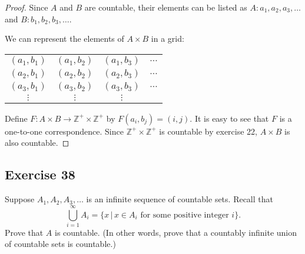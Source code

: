 \documentclass[14pt]{extarticle}
\newcommand{\Z}{\mathbb{Z}}
\begin{document}
\begin{proof}
    Since $A$ and $B$ are countable, their elements can be listed as \(A: a_1, a_2, a_3, \ldots\) and \(B: b_1, b_2, b_3, \ldots\).

    We can represent the elements of \(A \times B\) in a grid:

    \begin{center}
        \begin{tabular}{cccc}
            \((a_1, b_1)\) & \((a_1, b_2)\) & \((a_1, b_3)\) & \(\ldots\) \\
            \((a_2, b_1)\) & \((a_2, b_2)\) & \((a_2, b_3)\) & \(\ldots\) \\
            \((a_3, b_1)\) & \((a_3, b_2)\) & \((a_3, b_3)\) & \(\ldots\) \\
            \(\vdots\)     & \(\vdots\)     & \(\vdots\)     &            \\
        \end{tabular}
    \end{center}

    Define \(F: A \times B \to \Z^+ \times \Z^+\) by \(F(a_i, b_j) = (i, j)\). It is easy to see that $F$ is a one-to-one
    correspondence. Since \(\Z^+ \times \Z^+\) is countable by exercise 22, \(A \times B\) is also countable.
\end{proof}

\subsection{Exercise 38}
Suppose \(A_1, A_2, A_3, \ldots\) is an infinite sequence of countable sets. Recall that
\[
    \bigcup_{i=1}^{\infty} A_i = \{x \, | \, x \in A_i \text{ for some positive integer } i\}.
\]
Prove that $A$ is countable. (In other words, prove that a countably infinite union of countable sets is countable.)
\end{document}
